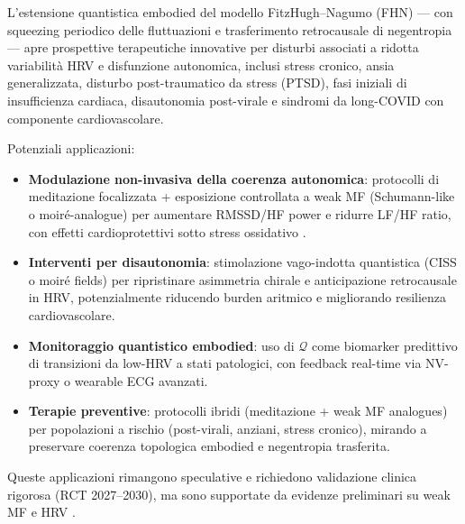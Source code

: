 \documentclass[11pt,a4paper]{article}
\let\oldcite\cite
\renewcommand{\cite}{\protect\oldcite}
\theoremstyle{plain}
\theoremstyle{definition}
\begin{document}
L'estensione quantistica embodied del modello FitzHugh--Nagumo (FHN) --- con squeezing periodico delle fluttuazioni e trasferimento retrocausale di negentropia --- apre prospettive terapeutiche innovative per disturbi associati a ridotta variabilità HRV e disfunzione autonomica, inclusi stress cronico, ansia generalizzata, disturbo post-traumatico da stress (PTSD), fasi iniziali di insufficienza cardiaca, disautonomia post-virale e sindromi da long-COVID con componente cardiovascolare.


\vspace{0.3cm}

Potenziali applicazioni:

\vspace{0.2cm}
\begin{itemize}
    \item \textbf{Modulazione non-invasiva della coerenza autonomica}: protocolli di meditazione focalizzata + esposizione controllata a weak MF (Schumann-like o moiré-analogue) per aumentare RMSSD/HF power e ridurre LF/HF ratio, con effetti cardioprotettivi sotto stress ossidativo \cite{Elhalel2019Schumann}.

    \vspace{0.2cm}
    \item \textbf{Interventi per disautonomia}: stimolazione vago-indotta quantistica (CISS o moiré fields) per ripristinare asimmetria chirale e anticipazione retrocausale in HRV, potenzialmente riducendo burden aritmico e migliorando resilienza cardiovascolare.

    \vspace{0.2cm}
    \item \textbf{Monitoraggio quantistico embodied}: uso di $\mathcal{Q}$ come biomarker predittivo di transizioni da low-HRV a stati patologici, con feedback real-time via NV-proxy o wearable ECG avanzati.


    \vspace{0.2cm}
    \item \textbf{Terapie preventive}: protocolli ibridi (meditazione + weak MF analogues) per popolazioni a rischio (post-virali, anziani, stress cronico), mirando a preservare coerenza topologica embodied e negentropia trasferita.
\end{itemize}

\vspace{0.3cm}

Queste applicazioni rimangono speculative e richiedono validazione clinica rigorosa (RCT 2027--2030), ma sono supportate da evidenze preliminari su weak MF e HRV \cite{Mansourian2023EMFmeta, Vieira2022geomagneticHRV, Zenchenko2025biogeosync}.
\end{document}
